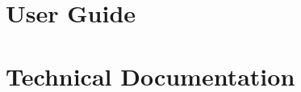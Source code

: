 \documentclass[a4paper]{report}
\begin{document}


\chapter{User Guide}
 



\printbibliography


\chapter{Technical Documentation}
\begin{refsection}

\printbibliography
\end{refsection}
\end{document}
